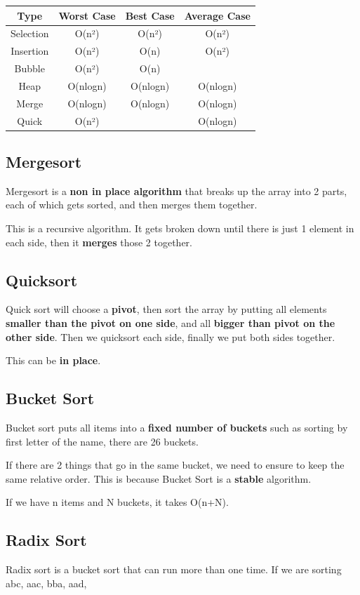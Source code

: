 \documentclass[12pt,letterpaper]{article} \usepackage{amsmath} \usepackage{graphicx} \usepackage[margin=1in]{geometry} \usepackage{longtable}  \usepackage{amssymb}
\begin{document}
	\begin{tabular}{|c|c|c|c|}
		\hline
		Type & Worst Case & Best Case & Average Case \\
		\hline
		Selection & O(n²) &  O(n²)  &  O(n²)  \\
		\hline
		Insertion &  O(n²)  &  O(n)  &  O(n²)  \\
		\hline
		Bubble &  O(n²)  &  O(n)  &  \\
		\hline
		Heap &  O(nlogn)  &  O(nlogn)  &  O(nlogn)  \\
		\hline
		Merge &  O(nlogn)  &  O(nlogn)  &  O(nlogn)  \\
		\hline
		Quick &  O(n²)  &  &  O(nlogn)  \\
		\hline
	\end{tabular}
	
	\subsection{Mergesort}
	Mergesort is a\textbf{ non in place algorithm} that breaks up the array into 2 parts, each of which gets sorted, and then merges them together. 
	
	This is a recursive algorithm. It gets broken down until there is just 1 element in each side, then it \textbf{merges} those 2 together. 
	
	\subsection{Quicksort}
	Quick sort will choose a \textbf{pivot}, then sort the array by putting all elements \textbf{smaller than the pivot on one side}, and all \textbf{bigger than pivot on the other side}. Then we quicksort each side, finally we put both sides together. 
	
	This can be \textbf{in place}.
	
	\subsection{Bucket Sort}
	Bucket sort puts all items into a \textbf{fixed number of buckets} such as sorting by first letter of the name, there are 26 buckets. 
	
	If there are 2 things that go in the same bucket, we need to ensure to keep the same relative order. This is because Bucket Sort is a \textbf{stable} algorithm. 
	
	If we have n items and N buckets, it takes O(n+N).
	
	\subsection{Radix Sort}
	Radix sort is a bucket sort that can run more than one time. If we are sorting abc, aac, bba, aad, 
	
\end{document}
